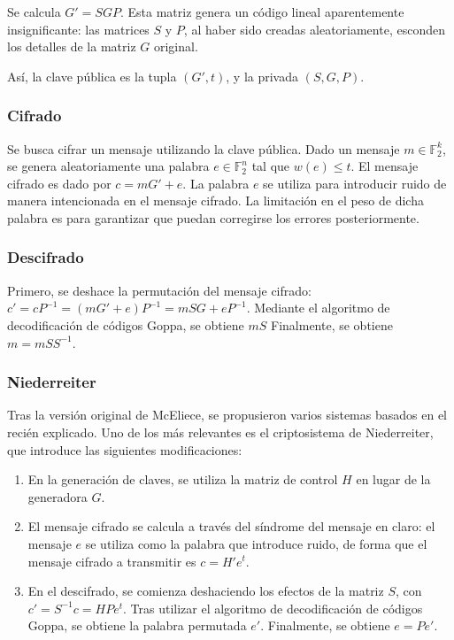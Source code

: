 Se calcula $G' = SGP$. Esta matriz genera un código lineal aparentemente insignificante: las matrices $S$ y $P$, al haber sido creadas aleatoriamente, esconden los detalles de la matriz $G$ original.

Así, la clave pública es la tupla $(G', t)$, y la privada $(S, G, P)$.

\subsubsection{Cifrado}

Se busca cifrar un mensaje utilizando la clave pública. Dado un mensaje $m \in \mathbb{F}_2^k$, se genera aleatoriamente una palabra $e \in \mathbb{F}_2^n$ tal que $w(e) \leq t$. El mensaje cifrado es dado por $c = mG' + e$. La palabra $e$ se utiliza para introducir ruido de manera intencionada en el mensaje cifrado. La limitación en el peso de dicha palabra es para garantizar que puedan corregirse los errores posteriormente.

\subsubsection{Descifrado}

Primero, se deshace la permutación del mensaje cifrado: $c' = cP^{-1} = (mG' + e)P^{-1} = mSG + eP^{-1}$. Mediante el algoritmo de decodificación de códigos Goppa, se obtiene $mS$ Finalmente, se obtiene $m = mSS^{-1}$.

\subsubsection{Niederreiter}

Tras la versión original de McEliece, se propusieron varios sistemas basados en el recién explicado. Uno de los más relevantes es el criptosistema de Niederreiter, que introduce las siguientes modificaciones:

\begin{enumerate}
	\item En la generación de claves, se utiliza la matriz de control $H$ en lugar de la generadora $G$.
	\item El mensaje cifrado se calcula a través del síndrome del mensaje en claro: el mensaje $e$ se utiliza como la palabra que introduce ruido, de forma que el mensaje cifrado a transmitir es $c = H'e^t$.
	\item En el descifrado, se comienza deshaciendo los efectos de la matriz $S$, con $c' = S^{-1}c = HPe^t$. Tras utilizar el algoritmo de decodificación de códigos Goppa, se obtiene la palabra permutada $e'$. Finalmente, se obtiene $e = Pe'$.
\end{enumerate}

